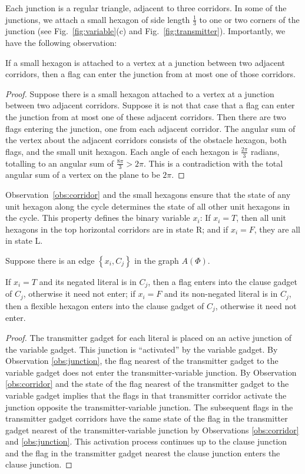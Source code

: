 Each junction is a regular triangle, adjacent to three corridors. 
In some of the junctions, we attach a small hexagon of side length $\frac{1}{3}$ to one or two corners of the junction (see Fig.~\ref{fig:variable}(c) and Fig.~\ref{fig:transmitter}). 
Importantly, we have the following observation:
\begin{observation}\label{obs:junction}
If a small hexagon is attached to a vertex at a junction between two adjacent corridors, then a flag can enter the junction from at most one of those corridors.
\end{observation}
\begin{proof}
Suppose there is a small hexagon attached to a vertex at a junction between two adjacent corridors.
Suppose it is not that case that a flag can enter the junction from at most one of these adjacent corridors.
Then there are two flags entering the junction, one from each adjacent corridor.
The angular sum of the vertex about the adjacent corridors consists of the obstacle hexagon, both flags, and the small unit hexagon.
Each angle of each hexagon is $\frac{2 \pi}{3}$ radians, totalling to an angular sum of $\frac{8 \pi}{3} > 2 \pi$.
This is a contradiction with the total angular sum of a vertex on the plane to be $2 \pi$.
\end{proof}

Observation~\ref{obs:corridor} and the small hexagons ensure that the state of any unit hexagon along the cycle determines the state of all other unit hexagons in the cycle. 
This property defines the binary variable $x_i$: If $x_i=T$, then all unit hexagons in the top horizontal corridors are in state R; and if $x_i=F$, they are all in state L.

Suppose there is an edge $\left\lbrace x_i, C_j \right\rbrace$ in the graph $A(\Phi)$.
\begin{lem}\label{lem:aux-3}
If $x_i = T$ and its negated literal is in $C_j$, then a flag enters into the clause gadget of $C_j$, otherwise it need not enter; if $x_i = F$ and its non-negated literal is in $C_j$, then a flexible hexagon enters into the clause gadget of $C_j$, otherwise it need not enter.
\end{lem}
\begin{proof}
The transmitter gadget for each literal is placed on an active junction of the variable gadget. 
This junction is ``activated'' by the variable gadget.  
By Observation \ref{obs:junction}, the flag nearest of the transmitter gadget to the variable gadget does not enter the transmitter-variable junction.
By Observation \ref{obs:corridor} and the state of the flag nearest of the transmitter gadget to the variable gadget implies that the flags in that transmitter corridor activate the junction opposite the transmitter-variable junction.
The subsequent flags in the transmitter gadget corridors have the same state of the flag in the transmitter gadget nearest of the transmitter-variable junction by Observations \ref{obs:corridor} and \ref{obs:junction}.
This activation process continues up to the clause junction and the flag in the transmitter gadget nearest the clause junction enters the clause junction.
\end{proof}

